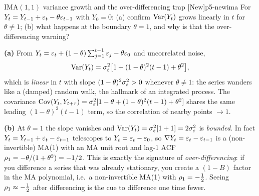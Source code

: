 \begin{exercise}{IMA$(1,1)$ variance growth and the over-differencing trap \quad\textnormal{[New]}}{p5-newima}
For $Y_t=Y_{t-1}+\varepsilon_t-\theta\varepsilon_{t-1}$ with $Y_0=0$: (a) confirm
$\operatorname{Var}(Y_t)$ grows linearly in $t$ for $\theta\ne1$; (b) what happens at the
boundary $\theta=1$, and why is that the over-differencing warning?
\end{exercise}
\begin{solution}
\textbf{(a)} From $Y_t=\varepsilon_t+(1-\theta)\sum_{j=1}^{t-1}\varepsilon_j-\theta\varepsilon_0$ and
uncorrelated noise,
\[
\operatorname{Var}(Y_t)=\sigma_\varepsilon^2\bigl[1+(1-\theta)^{2}(t-1)+\theta^{2}\bigr],
\]
which is \emph{linear} in $t$ with slope $(1-\theta)^{2}\sigma_\varepsilon^2>0$ whenever
$\theta\ne1$: the series wanders like a (damped) random walk, the hallmark of an
integrated process. The covariance
$\operatorname{Cov}(Y_t,Y_{t+\tau})=\sigma_\varepsilon^2[1-\theta+(1-\theta)^{2}(t-1)+\theta^{2}]$
shares the same leading $(1-\theta)^{2}(t-1)$ term, so the correlation of nearby
points $\to1$.

\textbf{(b)} At $\theta=1$ the slope vanishes and
$\operatorname{Var}(Y_t)=\sigma_\varepsilon^2[1+1]=2\sigma_\varepsilon^2$ is \emph{bounded}. In fact
$Y_t=Y_{t-1}+\varepsilon_t-\varepsilon_{t-1}$ telescopes to $Y_t=\varepsilon_t-\varepsilon_0$, so
$\nabla Y_t=\varepsilon_t-\varepsilon_{t-1}$ is a (non-invertible) MA(1) with an MA unit root
and lag-1 ACF $\rho_1=-\theta/(1+\theta^{2})=-1/2$. This is exactly the
signature of \emph{over-differencing}: if you difference a series that was
already stationary, you create a $(1-B)$ factor in the MA polynomial, i.e.\ a
non-invertible MA(1) with $\rho_1=-\tfrac12$. Seeing $\rho_1\approx-\tfrac12$
after differencing is the cue to difference one time fewer.
\end{solution}
